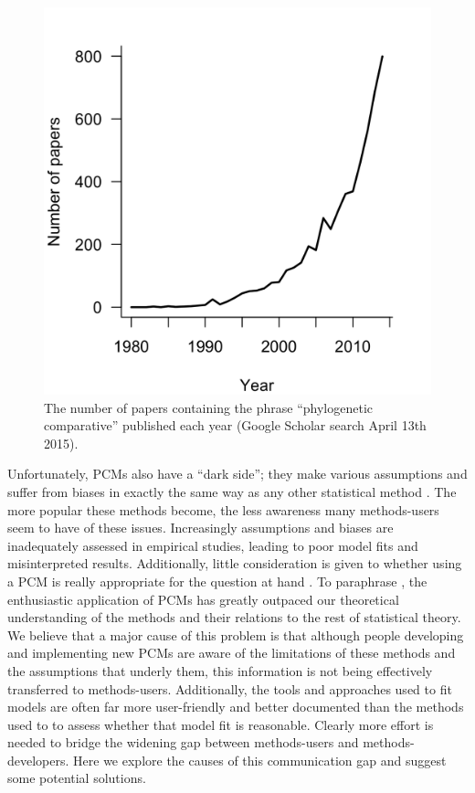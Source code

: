 \documentclass[a4paper,12pt]{article}
\begin{document}
  \begin{figure}[!htbp]
    \centering
      \includegraphics[width=12cm]{Figures/PCMCitations.png}
      \caption{The number of papers containing the phrase ``phylogenetic comparative'' published each year (Google Scholar search April 13th 2015).}
      \label{PCMCitations}
  \end{figure}

Unfortunately, PCMs also have a ``dark side''; they make various assumptions and suffer from biases in exactly the same way as any other statistical method \citep{freckleton2009seven,boettiger2012your}.
The more popular these methods become, the less awareness many methods-users seem to have of these issues. Increasingly assumptions and biases are inadequately assessed in empirical studies, leading to poor model fits and misinterpreted results. 
Additionally, little consideration is given to whether using a PCM is really appropriate for the question at hand \citep{losos2011seeing}. 
To paraphrase \citet{blomberg2012independent}, the enthusiastic application of PCMs has greatly outpaced our theoretical understanding of the methods and their relations to the rest of statistical theory.\\


We believe that a major cause of this problem is that although people developing and implementing new PCMs are aware of the limitations of these methods and the assumptions that underly them, this information is not being effectively transferred to methods-users.
Additionally, the tools and approaches used to fit models are often far more user-friendly and better documented than the methods used to to assess whether that model fit is reasonable. 
Clearly more effort is needed to bridge the widening gap between methods-users and methods-developers. 
Here we explore the causes of this communication gap and suggest some potential solutions.
\end{document}
